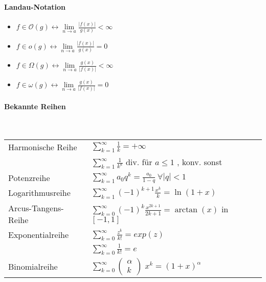 \documentclass[paper=a3,paper=landscape, fontsize=9pt, DIV=30]{scrartcl}
\newcommand{\laO}{\mathcal{O}}
\begin{document}
\begin{multicols*}{4}
		\paragraph{Landau-Notation}
		\begin{itemize}
			\item $f \in \laO(g) \leftrightarrow \lim\limits_{n \rightarrow a} \frac{\lvert f(x) \rvert}{g(x)} < \infty$
			\item $f \in o(g) \leftrightarrow \lim\limits_{n \rightarrow a} \frac{\lvert f(x) \rvert}{g(x)} = 0$
			\item $f \in \Omega(g) \leftrightarrow \lim\limits_{n \rightarrow a} \frac{g(x)}{\lvert f(x) \rvert} < \infty$
			\item $f \in \omega(g) \leftrightarrow \lim\limits_{n \rightarrow a} \frac{g(x)}{\lvert f(x) \rvert} = 0$
		\end{itemize}
		

        \paragraph{Bekannte Reihen}\hspace{0pt}\\
        \begin{tabular}{ll}
	        Harmonische Reihe &  $\sum_{k=1}^{\infty}\frac{1}{k}=+\infty$\\
	        & $\sum_{k=1}^{\infty}\frac{1}{k^a}$ div. für $a \leq 1 $ , konv. sonst \vspace{2pt}\\
	        Potenzreihe & $\sum_{k=1}^{\infty}a_0q^k=\frac{a_0}{1-q} \ \forall |q| < 1$\\\vspace{2pt}
	        Logarithmusreihe & $\sum_{k=1}^{\infty}(-1)^{k+1}\frac{x^k}{k} = \ln(1+x)$\\\vspace{2pt}
	        Arcus-Tangens-Reihe & $\sum_{k=0}^{\infty}(-1)^k\frac{x^{2k+1}}{2k+1} = \arctan(x)$ in $[-1,1]$\\\vspace{2pt}
	        Exponentialreihe & $\sum_{k=0}^{\infty} \frac{z^k}{k!} = exp(z)$\\
	        & $\sum_{k=0}^{\infty} \frac{1}{k!} = e$\\\vspace{2pt}
	        Binomialreihe & $\sum_{k=0}^{\infty} (\begin{smallmatrix} \alpha\\k \end{smallmatrix}) \; x^k = (1+x)^{\alpha}$
        \end{tabular}
	

\end{multicols*}
\end{document}
